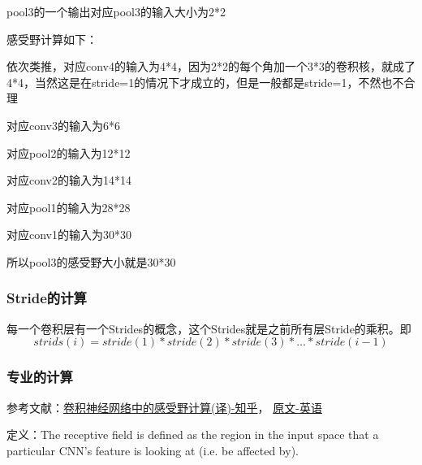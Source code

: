 pool3的一个输出对应pool3的输入大小为2*2

感受野计算如下：

依次类推，对应conv4的输入为4*4，因为2*2的每个角加一个3*3的卷积核，就成了4*4，当然这是在stride=1的情况下才成立的，但是一般都是stride=1，不然也不合理

对应conv3的输入为6*6

对应pool2的输入为12*12

对应conv2的输入为14*14

对应pool1的输入为28*28

对应conv1的输入为30*30

所以pool3的感受野大小就是30*30

\subsubsection{Stride的计算}

每一个卷积层有一个Strides的概念，这个Strides就是之前所有层Stride的乘积。即
\begin{displaymath}
strids(i) = stride(1) * stride(2) * stride(3) * \ldots * stride(i - 1)
\end{displaymath}

\subsubsection{专业的计算}

参考文献：\href{https://zhuanlan.zhihu.com/p/26663577}{卷积神经网络中的感受野计算(译)-知乎}， \href{https://medium.com/mlreview/a-guide-to-receptive-field-arithmetic-for-convolutional-neural-networks-e0f514068807}{原文-英语}

定义：The receptive field is defined as the region in the input space that a particular CNN’s feature is looking at (i.e. be affected by).

